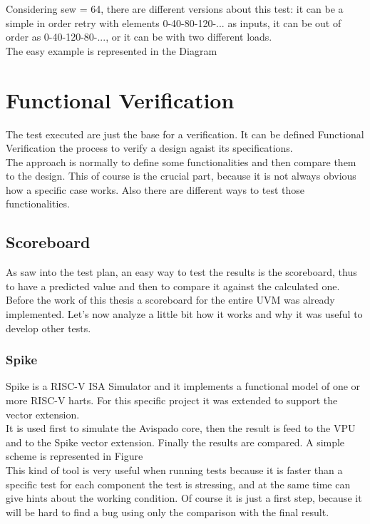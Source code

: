 Considering sew = 64, there are different versions about this test: it can be a simple in order retry with elements 0-40-80-120-... as inputs, it can be out of order as 0-40-120-80-..., or it can be with two different loads.\\

The easy example is represented in the Diagram %

\section{Functional Verification}
The test executed are just the base for a verification. It can be defined Functional Verification the process to verify a design agaist its specifications.\\

The approach is normally to define some functionalities and then compare them to the design. This of course is the crucial part, because it is not always obvious how a specific case works. Also there are different ways to test those functionalities.\\

\subsection{Scoreboard}
As saw into the test plan, an easy way to test the results is the scoreboard, thus to have a predicted value and then to compare it against the calculated one.\\

Before the work of this thesis a scoreboard for the entire UVM was already implemented. Let's now analyze a little bit how it works and why it was useful to develop other tests.

\subsubsection{Spike}
Spike is a RISC-V ISA Simulator and it implements a functional model of one or more RISC-V harts. For this specific project it was extended to support the vector extension.\\
It is used first to simulate the Avispado core, then the result is feed to the VPU and to the Spike vector extension. Finally the results are compared. A simple scheme is represented in Figure %
\\

This kind of tool is very useful when running tests because it is faster than a specific test for each component the test is stressing, and at the same time can give hints about the working condition. Of course it is just a first step, because it will be hard to find a bug using only the comparison with the final result.\\

